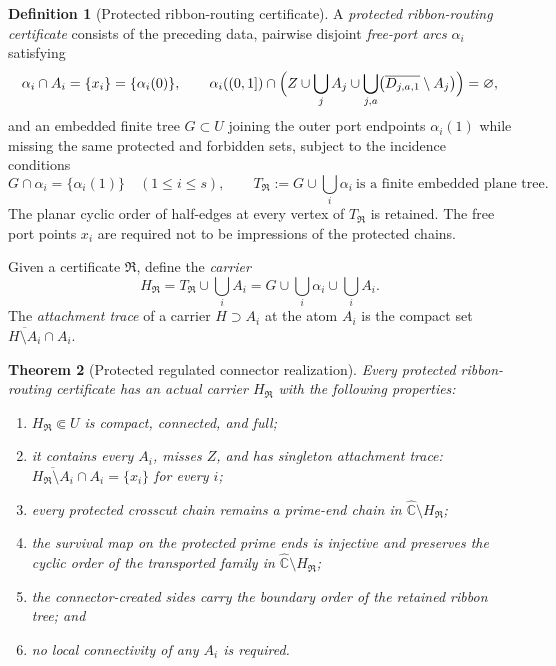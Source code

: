 \documentclass[11pt,reqno]{amsart}
\numberwithin{equation}{section}
\theoremstyle{plain}
\newtheorem{theorem}{Theorem}[section]
\theoremstyle{definition}
\newtheorem{definition}[theorem]{Definition}
\theoremstyle{remark}
\newcommand{\Chat}{\widehat{\mathbb C}}
\begin{document}
\begin{definition}[Protected ribbon-routing certificate]
\label{def:certificate}
A \emph{protected ribbon-routing certificate} consists of the preceding
data, pairwise disjoint \emph{free-port arcs} $\alpha_i$ satisfying
\[
 \alpha_i\cap A_i=\{x_i\}=\{\alpha_i(0)\},
 \qquad
 \alpha_i((0,1])\cap
 \Bigl(Z\cup\bigcup_jA_j\cup
 \bigcup_{j,a}\bigl(\overline{D_{j,a,1}}\setminus A_j\bigr)\Bigr)
 =\varnothing,
\]
and an embedded finite tree $G\subset U$ joining the outer port
endpoints $\alpha_i(1)$ while missing the same protected and forbidden
sets, subject to the incidence conditions
\begin{equation}
 G\cap\alpha_i=\{\alpha_i(1)\}
 \quad(1\le i\le s),
 \qquad
 T_{\mathfrak R}:=G\cup\bigcup_i\alpha_i
 \ \text{is a finite embedded plane tree.}
\label{eq:tree-incidence}
\end{equation}
The planar cyclic order of half-edges at every vertex of
$T_{\mathfrak R}$ is retained.  The free port points $x_i$ are required
not to be impressions of the protected chains.
\end{definition}

Given a certificate $\mathfrak R$, define the \emph{carrier}
\begin{equation}
 H_{\mathfrak R}
 =
 T_{\mathfrak R}\cup\bigcup_iA_i
 =
 G\cup\bigcup_i\alpha_i\cup\bigcup_iA_i .
\label{eq:carrier}
\end{equation}
The \emph{attachment trace} of a carrier $H\supset A_i$ at the atom
$A_i$ is the compact set
$\overline{H\setminus A_i}\cap A_i$.

\begin{theorem}[Protected regulated connector realization]
\label{thm:connector}
Every protected ribbon-routing certificate has an actual carrier
$H_{\mathfrak R}$ with the following properties:
\begin{enumerate}[label=\textup{(\roman*)}]
 \item $H_{\mathfrak R}\Subset U$ is compact, connected, and full;
 \item it contains every $A_i$, misses $Z$, and has singleton
  attachment trace:
  $\overline{H_{\mathfrak R}\setminus A_i}\cap A_i=\{x_i\}$ for every
  $i$;
 \item every protected crosscut chain remains a prime-end chain in
  $\Chat\setminus H_{\mathfrak R}$;
 \item the survival map on the protected prime ends is injective and
  preserves the cyclic order of the transported family in
  $\Chat\setminus H_{\mathfrak R}$;
 \item the connector-created sides carry the boundary order of the
  retained ribbon tree; and
 \item no local connectivity of any $A_i$ is required.
\end{enumerate}
\end{theorem}
\end{document}

